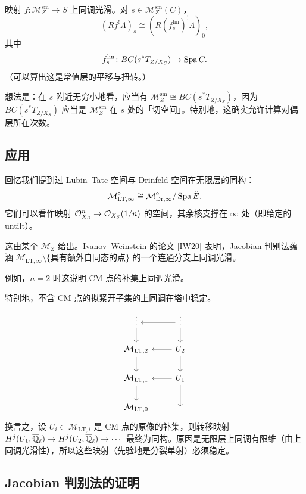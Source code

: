 \begin{theorem}
映射 $f\colon\mathcal{M}^{\mathrm{sm}}_Z\to S$ 上同调光滑。对 $s\in\mathcal{M}^{\mathrm{sm}}_Z(C)$，
\[
(Rf^!\Lambda)_s\cong(R(f^{\mathrm{lin}}_s)^!\Lambda)_0,
\]
其中
\[
f^{\mathrm{lin}}_s\colon BC(s^*T_{Z/X_S})\to\operatorname{Spa} C.
\]
（可以算出这是常值层的平移与扭转。）
\end{theorem}

想法是：在 $s$ 附近无穷小地看，应当有 $\mathcal{M}^{\mathrm{sm}}_Z\cong BC(s^*T_{Z/X_S})$，因为 $BC(s^*T_{Z/X_S})$ 应当是 $\mathcal{M}^{\mathrm{sm}}_Z$ 在 $s$ 处的「切空间」。特别地，这确实允许计算对偶层所在次数。

\subsection{应用}

回忆我们提到过 Lubin--Tate 空间与 Drinfeld 空间在无限层的同构：
\[
\mathcal{M}^\diamond_{\mathrm{LT},\infty}\cong\mathcal{M}^\diamond_{\mathrm{Dr},\infty}/\operatorname{Spa}\breve{E}.
\]
它们可以看作映射 $\mathcal{O}^n_{X_S}\to\mathcal{O}_{X_S}(1/n)$ 的空间，其余核支撑在 $\infty$ 处（即给定的 untilt）。

这由某个 $\mathcal{M}_Z$ 给出。Ivanov--Weinstein 的论文 [IW20] 表明，Jacobian 判别法蕴涵 $\mathcal{M}_{\mathrm{LT},\infty}\setminus\{\text{具有额外自同态的点}\}$ 的一个连通分支上同调光滑。

\begin{example}
例如，$n=2$ 时这说明 CM 点的补集上同调光滑。
\end{example}


特别地，不含 CM 点的拟紧开子集的上同调在塔中稳定。
\[
\begin{tikzcd}
\vdots \arrow[d] & \vdots \arrow[d] \arrow[l] \\
\mathcal{M}_{\mathrm{LT},2} \arrow[d] & U_2 \arrow[l] \arrow[d] \\
\mathcal{M}_{\mathrm{LT},1} \arrow[d] & U_1 \arrow[l] \arrow[d] \\
\mathcal{M}_{\mathrm{LT},0} & {}
\end{tikzcd}
\]
换言之，设 $U_i\subset\mathcal{M}_{\mathrm{LT},i}$ 是 CM 点的原像的补集，则转移映射 $H^j(U_1,\overline{\mathbb{Q}}_\ell)\to H^j(U_2,\overline{\mathbb{Q}}_\ell)\to\cdots$ 最终为同构。原因是无限层上同调有限维（由上同调光滑性），所以这些映射（先验地是分裂单射）必须稳定。

\subsection{Jacobian 判别法的证明}

